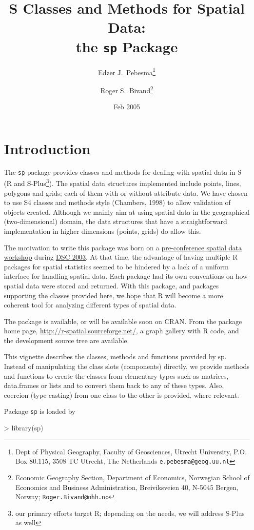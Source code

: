 \documentclass{article}
\title{ S Classes and Methods for Spatial Data:\\
the {\tt sp} Package }
\author{Edzer J.\ Pebesma\footnote{Dept of Physical Geography,
Faculty of Geosciences, Utrecht University, P.O. Box 80.115,
3508 TC Utrecht, The Netherlands {\tt e.pebesma@geog.uu.nl}} \and 
Roger S.\ Bivand\footnote{Economic Geography Section, Department of Economics, %
Norwegian School of Economics and Business Administration, %
Breiviksveien 40, N-5045 Bergen, Norway; {\tt Roger.Bivand@nhh.no}}}
\date{Feb 2005}
\begin{document}
\maketitle
\tableofcontents

\section{Introduction}

The {\tt sp} package provides classes and methods for dealing with
spatial data in S (R and S-Plus\footnote{our primary efforts target R;
depending on the needs, we will address S-Plus as well}). The spatial
data structures implemented include points, lines, polygons and grids;
each of them with or without attribute data.  We have chosen to use S4
classes and methods style (Chambers, 1998) to allow validation of objects
created. Although we mainly aim at using spatial data in the geographical
(two-dimensional) domain, the data structures that have a straightforward
implementation in higher dimensions (points, grids) do allow this.

The motivation to write this package was born on a
\href{http://spatial.nhh.no/meetings/vienna/index.html}{pre-conference
spatial data workshop} during
\href{http://www.ci.tuwien.ac.at/Conferences/DSC-2003/}{DSC 2003}.
At that time, the advantage of having multiple R packages for spatial
statistics seemed to be hindered by a lack of a uniform interface for
handling spatial data. Each package had its own conventions on how
spatial data were stored and returned. With this package, and packages
supporting the classes provided here, we hope that R will become a more
coherent tool for analyzing different types of spatial data.

The package is available, or will be available soon on CRAN. From the
package home page, \url{http://r-spatial.sourceforge.net/}, a graph
gallery with R code, and the development source tree are available.

This vignette describes the classes, methods and functions provided
by sp. Instead of manipulating the class slots (components) directly,
we provide methods and functions to create the classes from elementary
types such as matrices, data.frames or lists and to convert them back
to any of these types. Also, coercion (type casting) from one class to
the other is provided, where relevant.

Package {\tt sp} is loaded by 
\begin{Schunk}
\begin{Sinput}
> library(sp)
\end{Sinput}
\end{Schunk}
\end{document}
